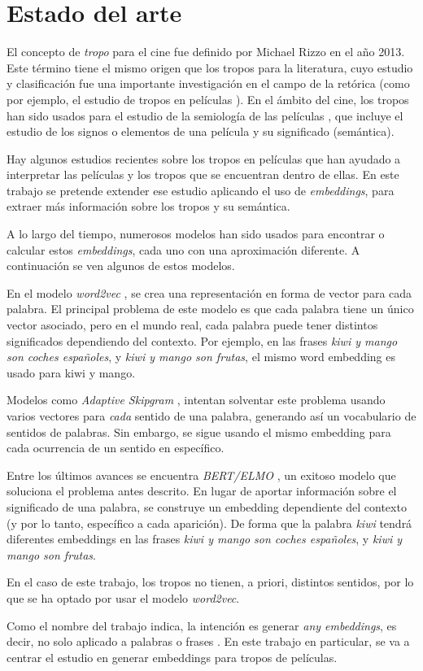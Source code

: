 \chapter{Estado del arte}

El concepto de \emph{tropo} para el cine fue definido por Michael Rizzo \cite{rizzo2013art} en el año 2013. Este término
tiene el mismo origen que los tropos para la literatura, cuyo estudio y clasificación fue una importante investigación en el
campo de la retórica (como por ejemplo, el estudio de tropos en películas \cite{nelson1998tropes}). En el ámbito del cine,
los tropos han sido usados para el estudio de la semiología de las películas \cite{howtoreadafilm}, que incluye el estudio
de los signos o elementos de una película y su significado (semántica).

Hay algunos estudios recientes sobre los tropos en películas \cite{garcia2018overview} que han ayudado a interpretar las
películas y los tropos que se encuentran dentro de ellas. En este trabajo se pretende extender ese estudio aplicando el uso
de \emph{embeddings}, para extraer más información sobre los tropos y su semántica.

A lo largo del tiempo, numerosos modelos han sido usados para encontrar o calcular estos \textit{embeddings}, cada uno
con una aproximación diferente. A continuación se ven algunos de estos modelos.

En el modelo \emph{word2vec} \cite{word2vec:1} \cite{word2vec:2}, se crea una representación
en forma de vector para cada palabra. El principal problema de este modelo es que cada palabra tiene un único vector asociado,
pero en el mundo real, cada palabra puede tener distintos significados dependiendo del contexto.
Por ejemplo, en las frases \emph{kiwi y mango son coches españoles}, y \emph{kiwi y mango son frutas},
el mismo word embedding es usado para kiwi y mango.

Modelos como \emph{Adaptive Skipgram} \cite{adaptiveskipgram}, intentan solventar este problema usando
varios vectores para \emph{cada} sentido de una palabra, generando así un vocabulario de sentidos de palabras.
Sin embargo, se sigue usando el mismo embedding para cada ocurrencia de un sentido en específico.

Entre los últimos avances se encuentra \emph{BERT/ELMO} \cite{bert}, un exitoso modelo que soluciona el
problema antes descrito. En lugar de aportar información sobre el significado de una palabra, se construye
un embedding dependiente del contexto (y por lo tanto, específico a cada aparición). De forma que la palabra
\emph{kiwi} tendrá diferentes embeddings en las frases \emph{kiwi y mango son coches españoles}, y
\emph{kiwi y mango son frutas}.

En el caso de este trabajo, los tropos no tienen, a priori, distintos sentidos, por lo que se ha optado
por usar el modelo \emph{word2vec}.

Como el nombre del trabajo indica, la intención es generar \textit{any embeddings}, es decir, no solo aplicado a
palabras \cite{word2vec:1} \cite{word2vec:2} o frases \cite{kiros2015skip}. En este trabajo en particular, se va a centrar
el estudio en generar embeddings para tropos de películas.
